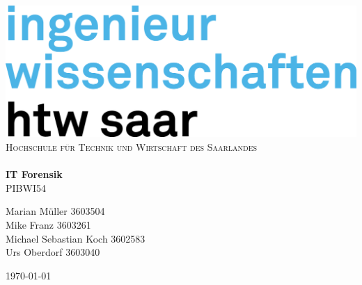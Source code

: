 \begin{titlepage}
\begin{center}

\includegraphics[scale=1]{graphics/htw_Logo_inwi_CO.png}\\[1cm]

\textsc{\LARGE Hochschule für Technik und Wirtschaft des Saarlandes}\\[1.5cm]


\hrulefill \\[0.4cm]
{ \huge \bfseries IT Forensik \\[0.4cm] }
\textsc{PIBWI54}\\[0.5cm]
\hrulefill
\noindent


Marian Müller 3603504\\
Mike Franz 3603261\\
Michael Sebastian Koch 3602583\\
Urs Oberdorf 3603040\\


\vfill
\begin{center}
{\large \today}
\end{center}
\end{center}
\end{titlepage}